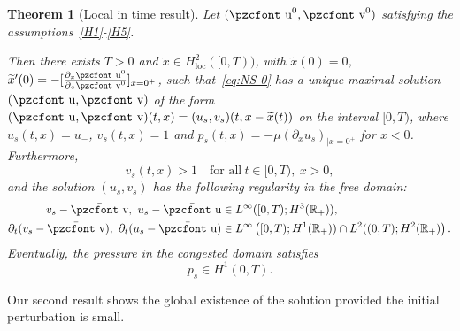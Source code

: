 \documentclass[10pt]{amsart}
\newtheorem{theo}{Theorem}[section]
\theoremstyle{definition}\newtheorem{defi}[theo]{Definition}\newtheorem{rema}[theo]{Remark}\newtheorem{exam}[theo]{Example}\newtheorem{exem}[theo]{Example}\newtheorem{nota}[theo]{Notation}
\newcommand{\mathpzc}[1]{\text{\pzcfont #1}}
\newcommand{\R}{\mathbb{R}}
\newcommand{\bv}{\bar{\mathpzc{v}}}
\newcommand{\bu}{\bar{\mathpzc{u}}}
\newcommand{\rloc}{\mathrm{loc}}
\newcommand{\tv}{\mathpzc{v}}
\newcommand{\tu}{\mathpzc{u}}
\newcommand{\tx}{\widetilde{x}}
\begin{document}
\begin{theo}[Local in time result]
Let $(\tu^0, \tv^0)$ satisfying the assumptions~\eqref{H1}-\eqref{H5}.

Then there exists $T>0$ and $\tx \in H^2_\rloc([0,T))$, with $\tx(0) = 0$, $\tx'(0) = -[\frac{\partial_x\tu^0}{\partial_x \tv^0}]_{x=0^+}$, such that~\eqref{eq:NS-0} has a unique maximal solution $(\tu,\tv)$ of the form $(\tu,\tv)(t,x)= (u_s, v_s)(t, x-\tx(t))$ on the interval $[0, T)$, where $u_s(t,x)= u_-$, $v_s(t,x)= 1$ and $p_s(t,x) = -\mu (\partial_x u_s)_{|x=0^+}$ for $x<0$. Furthermore,
\begin{equation}
v_s(t,x) > 1 \quad \text{for all}~t\in [0,T),~x > 0,
\end{equation}
and the solution $(u_s,v_s)$ has the following regularity in the free domain:
\begin{align}
v_s - \bv, \ u_s -\bu &\in L^\infty([0,T); H^3(\R_+)), \\
\partial_t(v_s -\bv),~\partial_t(u_s-\bu)
&\in L^\infty\left([0,T);H^1(\R_+)) \cap L^2((0,T); H^2(\R_+)\right).
\end{align}
Eventually, the pressure in the congested domain satisfies
\begin{equation}\label{thm:main-loc}
p_s \in H^1(0,T).
\end{equation}
\end{theo}



Our second result shows the global existence of the solution provided the initial perturbation is small.
\end{document}
